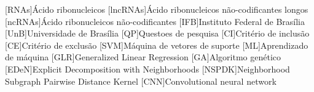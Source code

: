 \begin{acronym}[ACRONYM] 
[RNAs]{Ácido ribonucleicos}
[lncRNAs]{Ácido ribonucleicos não-codificantes longos}
[ncRNAs]{Ácido ribonucleicos não-codificantes}
[IFB]{Instituto Federal de Brasília}
[UnB]{Universidade de Brasília}
[QP]{Questoes de pesquisa}
[CI]{Critério de inclusão}
[CE]{Critério de exclusão}
[SVM]{Máquina de vetores de suporte}
[ML]{Aprendizado de máquina}
[GLR]{Generalized Linear Regression}
[GA]{Algoritmo genético}
[EDeN]{Explicit Decomposition with Neighborhoods}
[NSPDK]{Neighborhood Subgraph Pairwise Distance Kernel}
[CNN]{Convolutional neural network}


\end{acronym}